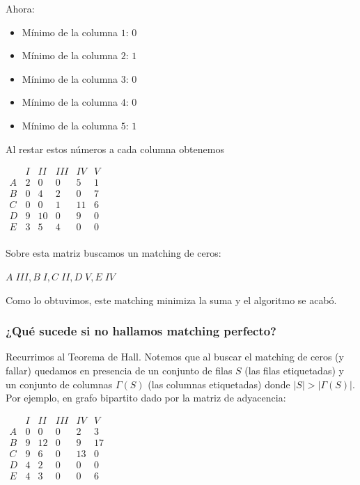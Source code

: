 \documentclass[10pt,a4paper]{article}
\begin{document}
Ahora:

\begin{itemize}

	\item Mínimo de la columna $1$: $0$
	\item Mínimo de la columna $2$: $1$
	\item Mínimo de la columna $3$: $0$
	\item Mínimo de la columna $4 $: $0$
	\item Mínimo de la columna $5$: $1$
\end{itemize}

Al restar estos números a cada columna obtenemos

\begin{center}
$\begin{array}{c|ccccc} &I&II&III&IV&V\\ \hline A&2&0&0&5&1\\ B&0&4&2&0&7\\ C&0&0&1&11&6\\ D&9&10&0&9&0\\ E&3&5&4&0&0\\ \end{array}$
\end{center}

Sobre esta matriz buscamos un matching de ceros:

\begin{center}
$A\;III, B\;I, C\;II, D\;V, E\;IV$
\end{center}

Como lo obtuvimos, este matching minimiza la suma y el algoritmo se acabó.

\subsubsection*{¿Qué sucede si no hallamos matching perfecto?}

Recurrimos al Teorema de Hall. Notemos que al buscar el matching de ceros (y fallar) quedamos en presencia de un conjunto de filas $S$ (las filas etiquetadas) y un conjunto de columnas $\Gamma(S)$ (las columnas etiquetadas) donde $\lvert S\rvert > \lvert \Gamma(S)\rvert$. Por ejemplo, en grafo bipartito dado por la matriz de adyacencia:

\begin{center}
$\begin{array}{c|ccccc} & I & II & III & IV & V \\ A & 0 & 0 & 0 & 2 & 3\\ B & 9 & 12 & 0 & 9 & 17 \\ C & 9 & 6 & 0 & 13 & 0 \\ D & 4 & 2 & 0 & 0 & 0 \\ E & 4 & 3 & 0 & 0 & 6 \end{array}$
\end{center}
\end{document}
